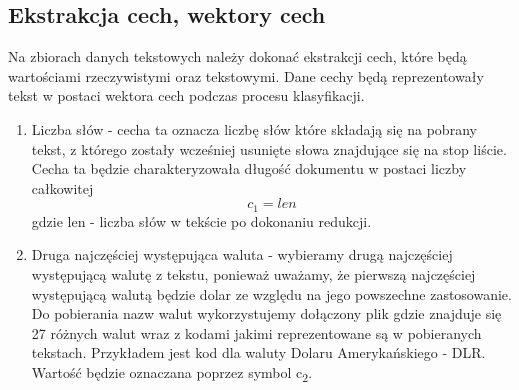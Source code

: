 \documentclass{classrep}
\begin{document}
\subsection{Ekstrakcja cech, wektory cech}
Na zbiorach danych tekstowych należy dokonać ekstrakcji cech, które będą wartościami rzeczywistymi oraz tekstowymi. Dane cechy będą reprezentowały tekst w postaci wektora cech podczas procesu klasyfikacji. \\
\begin{enumerate}
  \item Liczba słów - cecha ta oznacza liczbę słów które składają się na pobrany tekst, z którego zostały wcześniej usunięte słowa znajdujące się na stop liście. Cecha ta będzie charakteryzowała długość dokumentu w postaci liczby całkowitej \begin{equation}  c_1 = len \end{equation} gdzie len - liczba słów w tekście po dokonaniu redukcji.
  
\item Druga najczęściej występująca waluta - wybieramy drugą najczęściej występującą walutę z tekstu, ponieważ uważamy, że pierwszą najczęściej występującą walutą będzie dolar ze względu na jego powszechne zastosowanie. Do pobierania nazw walut wykorzystujemy dołączony plik gdzie znajduje się 27 różnych walut wraz z kodami jakimi reprezentowane są w pobieranych tekstach. Przykładem jest kod dla waluty Dolaru Amerykańskiego - DLR. Wartość będzie oznaczana poprzez symbol  c\textsubscript{2}. 
 

\end{enumerate}
\end{document}

